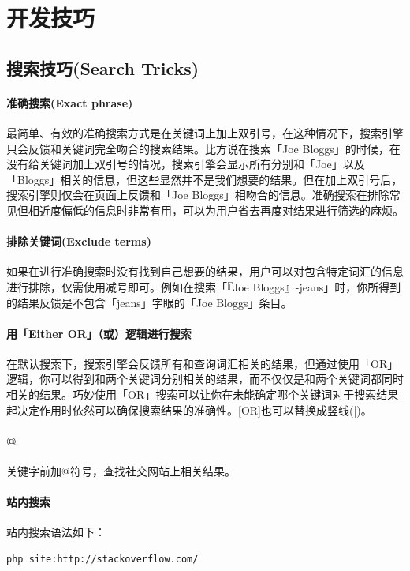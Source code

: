 \documentclass{book}
\begin{document}
\section{开发技巧}

\subsection{搜索技巧(Search Tricks)}

\paragraph{准确搜索(Exact phrase)}
最简单、有效的准确搜索方式是在关键词上加上双引号，在这种情况下，搜索引擎只会反馈和关键词完全吻合的搜索结果。比方说在搜索「Joe Bloggs」的时候，在没有给关键词加上双引号的情况，搜索引擎会显示所有分别和「Joe」以及「Bloggs」相关的信息，但这些显然并不是我们想要的结果。但在加上双引号后，搜索引擎则仅会在页面上反馈和「Joe Bloggs」相吻合的信息。准确搜索在排除常见但相近度偏低的信息时非常有用，可以为用户省去再度对结果进行筛选的麻烦。

\paragraph{排除关键词(Exclude terms)}
如果在进行准确搜索时没有找到自己想要的结果，用户可以对包含特定词汇的信息进行排除，仅需使用减号即可。例如在搜索「『Joe Bloggs』-jeans」时，你所得到的结果反馈是不包含「jeans」字眼的「Joe Bloggs」条目。

\paragraph{用「Either OR」（或）逻辑进行搜索}
在默认搜索下，搜索引擎会反馈所有和查询词汇相关的结果，但通过使用「OR」逻辑，你可以得到和两个关键词分别相关的结果，而不仅仅是和两个关键词都同时相关的结果。巧妙使用「OR」搜索可以让你在未能确定哪个关键词对于搜索结果起决定作用时依然可以确保搜索结果的准确性。[OR]也可以替换成竖线(|)。

\paragraph{@}关键字前加@符号，查找社交网站上相关结果。

\paragraph{站内搜索}站内搜索语法如下：

\begin{lstlisting}
php site:http://stackoverflow.com/
\end{lstlisting}
\end{document}
